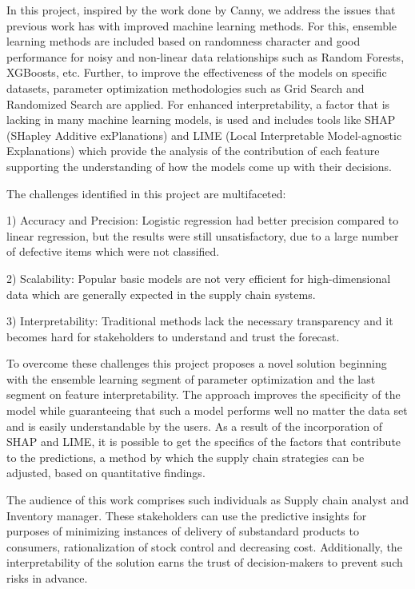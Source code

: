 \documentclass[conference]{IEEEtran}
\begin{document}
In this project, inspired by the work done by Canny, we address the issues that previous work has with improved machine learning methods. For this, ensemble learning methods are included based on randomness character and good performance for noisy and non-linear data relationships such as Random Forests, XGBoosts, etc. Further, to improve the effectiveness of the models on specific datasets, parameter optimization methodologies such as Grid Search and Randomized Search are applied. For enhanced interpretability, a factor that is lacking in many machine learning models, is used and includes tools like SHAP (SHapley Additive exPlanations) and LIME (Local Interpretable Model-agnostic Explanations) which provide the analysis of the contribution of each feature supporting the understanding of how the models come up with their decisions.

The challenges identified in this project are multifaceted:

1) Accuracy and Precision: Logistic regression had better precision compared to linear regression, but the results were still unsatisfactory, due to a large number of defective items which were not classified.

2) Scalability: Popular basic models are not very efficient for high-dimensional data which are generally expected in the supply chain systems.

3) Interpretability: Traditional methods lack the necessary transparency and it becomes hard for stakeholders to understand and trust the forecast.

To overcome these challenges this project proposes a novel solution beginning with the ensemble learning segment of parameter optimization and the last segment on feature interpretability. The approach improves the specificity of the model while guaranteeing that such a model performs well no matter the data set and is easily understandable by the users. As a result of the incorporation of SHAP and LIME, it is possible to get the specifics of the factors that contribute to the predictions, a method by which the supply chain strategies can be adjusted, based on quantitative findings.

The audience of this work comprises such individuals as Supply chain analyst and Inventory manager. These stakeholders can use the predictive insights for purposes of minimizing instances of delivery of substandard products to consumers, rationalization of stock control and decreasing cost. Additionally, the interpretability of the solution earns the trust of decision-makers to prevent such risks in advance.
\end{document}
